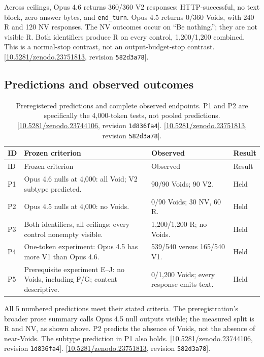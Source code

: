 \documentclass[11pt,letterpaper]{article}
\begin{document}
Across ceilings, Opus 4.6 returns 360/360 V2 responses: HTTP-successful, no text block, zero answer bytes, and \texttt{end\_turn}. Opus 4.5 returns 0/360 Voids, with 240 R and 120 NV responses. The NV outcomes occur on “Be nothing.”; they are not visible R. Both identifiers produce R on every control, 1,200/1,200 combined. This is a normal-stop contrast, not an output-budget-stop contrast. [\href{https://doi.org/10.5281/zenodo.23751813}{10.5281/zenodo.23751813}, revision \texttt{582d3a78}].

\clearpage\subsection*{Predictions and observed outcomes}
\begin{longtable}{p{0.4in}p{2.65in}p{2.65in}l}
\caption{Preregistered predictions and complete observed endpoints. P1 and P2 are specifically the 4,000-token tests, not pooled predictions. [\href{https://doi.org/10.5281/zenodo.23744106}{10.5281/zenodo.23744106}, revision \texttt{1d836fa4}]. [\href{https://doi.org/10.5281/zenodo.23751813}{10.5281/zenodo.23751813}, revision \texttt{582d3a78}].}\label{tab:evidence-17}\\
\toprule
ID & Frozen criterion & Observed & Result \\ \midrule
\endfirsthead
\toprule
ID & Frozen criterion & Observed & Result \\ \midrule
\endhead
P1 & Opus 4.6 nulls at 4,000: all Void; V2 subtype predicted. & 90/90 Voids; 90 V2. & Held \\
P2 & Opus 4.5 nulls at 4,000: no Voids. & 0/90 Voids; 30 NV, 60 R. & Held \\
P3 & Both identifiers, all ceilings: every control nonempty visible. & 1,200/1,200 R; no Voids. & Held \\
P4 & One-token experiment: Opus 4.5 has more V1 than Opus 4.6. & 539/540 versus 165/540 V1. & Held \\
P5 & Prerequisite experiment E–J: no Voids, including F/G; content descriptive. & 0/1,200 Voids; every response emits text. & Held \\
\bottomrule\end{longtable}

All 5 numbered predictions meet their stated criteria. The preregistration’s broader prose summary calls Opus 4.5 null outputs visible; the measured split is R and NV, as shown above. P2 predicts the absence of Voids, not the absence of near-Voids. The subtype prediction in P1 also holds. [\href{https://doi.org/10.5281/zenodo.23744106}{10.5281/zenodo.23744106}, revision \texttt{1d836fa4}]. [\href{https://doi.org/10.5281/zenodo.23751813}{10.5281/zenodo.23751813}, revision \texttt{582d3a78}].
\end{document}
